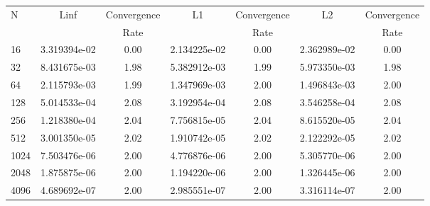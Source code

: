 \documentclass[12pt]{article}
\begin{document}
	\begin{tabular}{l|c|c|c|c|c|c}
		N&Linf&Convergence&L1&Convergence&L2&Convergence\\
		&&Rate&&Rate&&Rate\\
		\hline
		16&3.319394e-02&0.00&2.134225e-02&0.00&2.362989e-02&0.00\\
		\hline
		32&8.431675e-03&1.98&5.382912e-03&1.99&5.973350e-03&1.98\\
		\hline
		64&2.115793e-03&1.99&1.347969e-03&2.00&1.496843e-03&2.00\\
		\hline
		128&5.014533e-04&2.08&3.192954e-04&2.08&3.546258e-04&2.08\\
		\hline
		256&1.218380e-04&2.04&7.756815e-05&2.04&8.615520e-05&2.04\\
		\hline
		512&3.001350e-05&2.02&1.910742e-05&2.02&2.122292e-05&2.02\\
		\hline
		1024&7.503476e-06&2.00&4.776876e-06&2.00&5.305770e-06&2.00\\
		\hline
		2048&1.875875e-06&2.00&1.194220e-06&2.00&1.326445e-06&2.00\\
		\hline
		4096&4.689692e-07&2.00&2.985551e-07&2.00&3.316114e-07&2.00\\
	\end{tabular}
\end{document}
